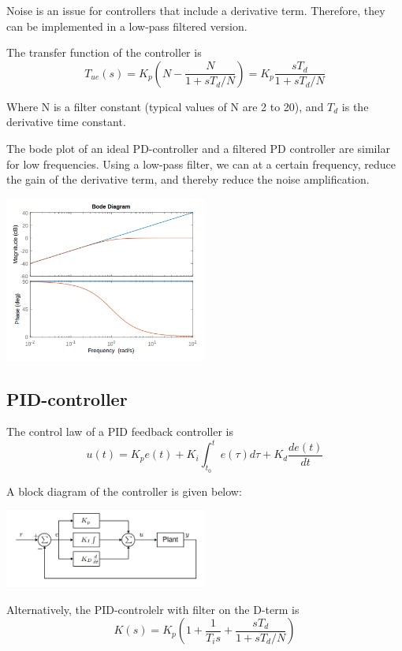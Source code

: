 Noise is an issue for controllers that include a derivative term. Therefore, they can
be implemented in a low-pass filtered version.

The transfer function of the controller is
$$T_{ue}(s) = K_p \left(N-\frac{N}{1+sT_d/N}\right) = K_p \frac{sT_d}{1+sT_d/N}$$

Where N is a filter constant (typical values of N are 2 to 20), and $T_d$ is the derivative time constant.

\newpage

The bode plot of an ideal PD-controller and a filtered PD controller are similar for low frequencies.
Using a low-pass filter, we can at a certain frequency, reduce the gain of the derivative term, and
thereby reduce the noise amplification.

\begin{center}
	\includegraphics[width = 0.5\textwidth]{Images/bode-pd.png}
\end{center}

\subsection{PID-controller}
The control law of a PID feedback controller is
$$u(t) = K_p e(t) + K_i \int_{t_0}^t e(\tau) d\tau + K_d \frac{de(t)}{dt}$$

A block diagram of the controller is given below:
\begin{center}
	\includegraphics[width = 0.5\textwidth]{Images/pid.png}
\end{center}

Alternatively, the PID-controlelr with filter on the D-term is
$$K(s) = K_p \left(1+\frac{1}{T_i s} + \frac{sT_d}{1+sT_d/N}\right)$$

